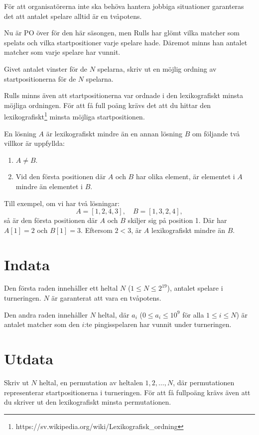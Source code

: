 För att organisatörerna inte ska behöva hantera jobbiga situationer garanteras det att antalet spelare alltid är en tvåpotens.

Nu är PO över för den här säsongen,  
men Rulls har glömt vilka matcher som spelats  
och vilka startpositioner varje spelare hade.  
Däremot minns han antalet matcher som varje spelare har vunnit.

Givet antalet vinster för de $N$ spelarna,  
skriv ut en möjlig ordning av startpositionerna för de $N$ spelarna.

Rulls minns även att startpositionerna var ordnade i den lexikografiskt minsta möjliga ordningen.
För att få full poäng krävs det att du hittar den lexikografiskt\footnote{https://sv.wikipedia.org/wiki/Lexikografisk\_ordning} minsta möjliga startpositionen.



En lösning $A$ är lexikografiskt mindre än en annan lösning $B$ om följande två villkor är uppfyllda:  
\begin{enumerate}  
    \item $A \neq B$.  
    \item Vid den första positionen där $A$ och $B$ har olika element, är elementet i $A$ mindre än elementet i $B$.  
\end{enumerate}  

Till exempel, om vi har två lösningar:  
$$
A = [1, 2, 4, 3], \quad B = [1, 3, 2, 4],  
$$  
så är den första positionen där $A$ och $B$ skiljer sig på position 1. Där har $A[1] = 2$ och $B[1] = 3$. Eftersom $2 < 3$, är $A$ lexikografiskt mindre än $B$.  


\section*{Indata}
Den första raden innehåller ett heltal $N$ ($1 \leq N \leq 2^{19}$), antalet spelare i turneringen. $N$ är garanterat att vara en tvåpotens.

Den andra raden innehåller $N$ heltal, där $a_i$ ($0 \leq a_i \leq 10^9$ för alla $1 \leq i \leq N$) är antalet matcher som den $i$:te pingisspelaren har vunnit under turneringen.

\section*{Utdata}
Skriv ut $N$ heltal, en permutation av heltalen $1,2,\ldots, N$, där permutationen representerar startpositionerna i turneringen. 
För att få fullpoäng krävs även att du skriver ut den lexikografiskt minsta permutationen.

